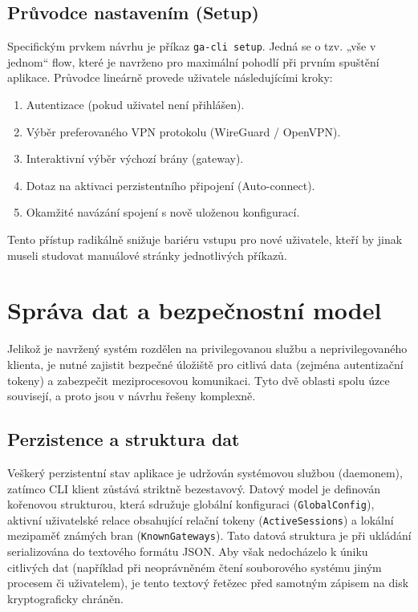 \subsection{Průvodce nastavením (Setup)}
\label{sec:setup_flow}
Specifickým prvkem návrhu je příkaz \texttt{ga-cli setup}. Jedná se o tzv. „vše v jednom“ flow, které je navrženo pro maximální pohodlí při prvním spuštění aplikace. Průvodce lineárně provede uživatele následujícími kroky:
\begin{enumerate}
    \item Autentizace (pokud uživatel není přihlášen).
    \item Výběr preferovaného VPN protokolu (WireGuard / OpenVPN).
    \item Interaktivní výběr výchozí brány (gateway).
    \item Dotaz na aktivaci perzistentního připojení (Auto-connect).
    \item Okamžité navázání spojení s nově uloženou konfigurací.
\end{enumerate}
Tento přístup radikálně snižuje bariéru vstupu pro nové uživatele, kteří by jinak museli studovat manuálové stránky jednotlivých příkazů.

\section{Správa dat a bezpečnostní model}
\label{sec:data_a_bezpecnost}

Jelikož je navržený systém rozdělen na privilegovanou službu a neprivilegovaného klienta, je nutné zajistit bezpečné úložiště pro citlivá data (zejména autentizační tokeny) a zabezpečit meziprocesovou komunikaci. Tyto dvě oblasti spolu úzce souvisejí, a proto jsou v návrhu řešeny komplexně.

\subsection{Perzistence a struktura dat}

Veškerý perzistentní stav aplikace je udržován systémovou službou (daemonem), zatímco CLI klient zůstává striktně bezestavový. Datový model je definován kořenovou strukturou, která sdružuje globální konfiguraci (\texttt{GlobalConfig}), aktivní uživatelské relace obsahující relační tokeny (\texttt{ActiveSessions}) a lokální mezipaměť známých bran (\texttt{KnownGateways}). Tato datová struktura je při ukládání serializována do textového formátu JSON. Aby však nedocházelo k úniku citlivých dat (například při neoprávněném čtení souborového systému jiným procesem či uživatelem), je tento textový řetězec před samotným zápisem na disk kryptograficky chráněn.

